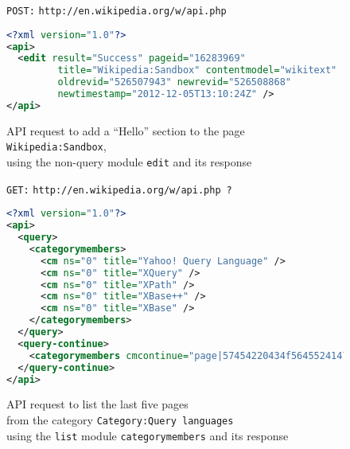 \begin{figure}[p]
\texttt{POST:}
\texttt{http://en.wikipedia.org/w/api.php}


\begin{lstlisting}[language=xml]
<?xml version="1.0"?>
<api>
  <edit result="Success" pageid="16283969"
         title="Wikipedia:Sandbox" contentmodel="wikitext"
         oldrevid="526507943" newrevid="526508868"
         newtimestamp="2012-12-05T13:10:24Z" />
</api>
\end{lstlisting}

\caption[API request to add a new section to a page and its response]{
\ac{API} request to add a “Hello” section to the page \texttt{Wikipedia:\allowbreak Sandbox}, \\
using the non-query module \texttt{edit} and its response}
\label{API edit example}
\end{figure}

\begin{figure}[p]
\texttt{GET:}
\texttt{http://en.wikipedia.org/w/api.php}~\texttt{?}

\begin{lstlisting}[language=xml]
<?xml version="1.0"?>
<api>
  <query>
    <categorymembers>
      <cm ns="0" title="Yahoo! Query Language" />
      <cm ns="0" title="XQuery" />
      <cm ns="0" title="XPath" />
      <cm ns="0" title="XBase++" />
      <cm ns="0" title="XBase" />
    </categorymembers>
  </query>
  <query-continue>
    <categorymembers cmcontinue="page|57454220434f5645524147..." />
  </query-continue>
</api>
\end{lstlisting}

\caption[API request to list pages from a category and its response]{
\ac{API} request to list the last five pages \\
from the category \texttt{Category:\allowbreak Query languages} \\
using the \texttt{list} module \lstinline{categorymembers}
and its response}
\label{API categorymembers example}
\end{figure}

